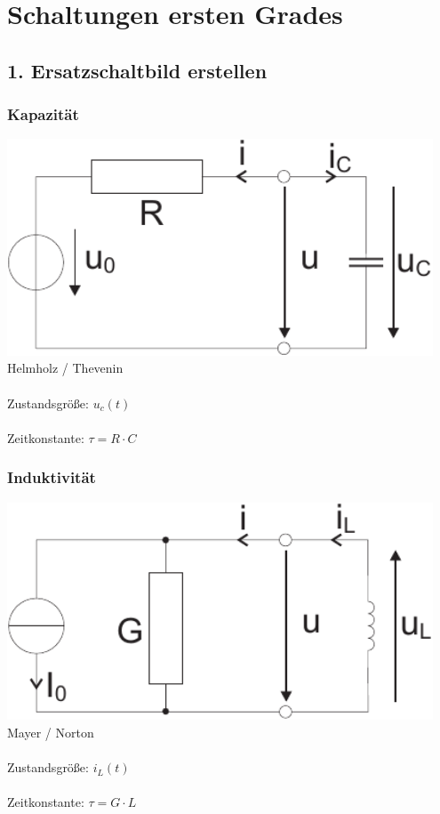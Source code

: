 \documentclass[a4paper,twocolumn,10pt]{article}
\begin{document}
\section*{Schaltungen ersten Grades}
\subsection*{1. Ersatzschaltbild erstellen}
\begin{minipage}[t]{0.23\textwidth}
\subsubsection*{Kapazität}
\includegraphics[width=0.95\textwidth]{Grafiken/Helmholz-Thevenin}\\
Helmholz / Thevenin\\\\
Zustandsgröße: $u_c(t)$\\\\
Zeitkonstante: $\tau = R\cdot C$
\end{minipage}
\hfill
\begin{minipage}[t]{0.23\textwidth}
\subsubsection*{Induktivität}
\includegraphics[width=0.95\textwidth]{Grafiken/Mayer-Norton}\\
Mayer / Norton\\\\
Zustandsgröße: $i_L(t)$\\\\
Zeitkonstante: $\tau = G\cdot L$
\end{minipage}
\end{document}
